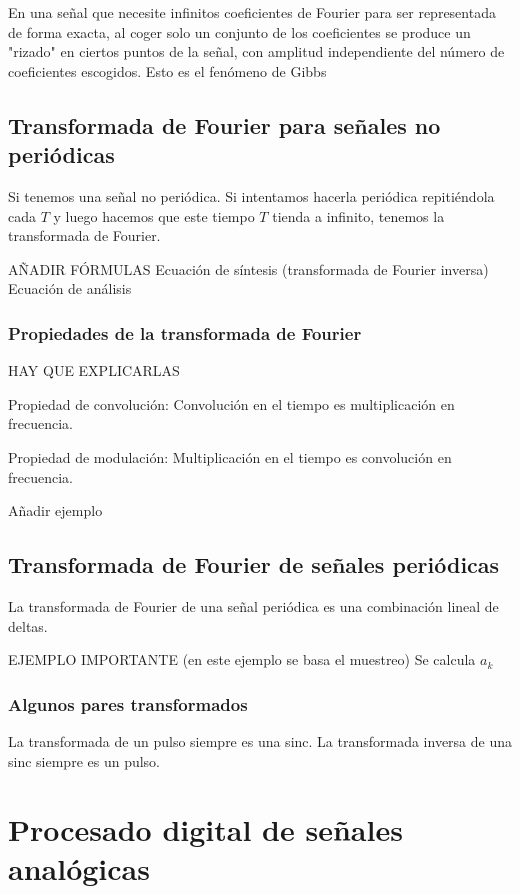 \documentclass[a4paper]{book}
\begin{document}
En una señal que necesite infinitos coeficientes de Fourier para ser representada de forma exacta, al coger solo un conjunto de los coeficientes se produce un "rizado" en ciertos puntos de la señal, con amplitud independiente del número de coeficientes escogidos. Esto es el fenómeno de Gibbs

\section{Transformada de Fourier para señales no periódicas}

Si tenemos una señal no periódica. Si intentamos hacerla periódica repitiéndola cada $T$ y luego hacemos que este tiempo $T$ tienda a infinito, tenemos la transformada de Fourier.

AÑADIR FÓRMULAS
Ecuación de síntesis (transformada de Fourier inversa)
Ecuación de análisis

\subsection{Propiedades de la transformada de Fourier}
HAY QUE EXPLICARLAS

Propiedad de convolución: Convolución en el tiempo es multiplicación en frecuencia.

Propiedad de modulación: Multiplicación en el tiempo es convolución en frecuencia.

Añadir ejemplo

\section{Transformada de Fourier de señales periódicas}

La transformada de Fourier de una señal periódica es una combinación lineal de deltas.

EJEMPLO IMPORTANTE (en este ejemplo se basa el muestreo)
Se calcula $a_k$
\subsection{Algunos pares transformados}

La transformada de un pulso siempre es una sinc.
La transformada inversa de una sinc siempre es un pulso.

\chapter{Procesado digital de señales analógicas}
\end{document}
